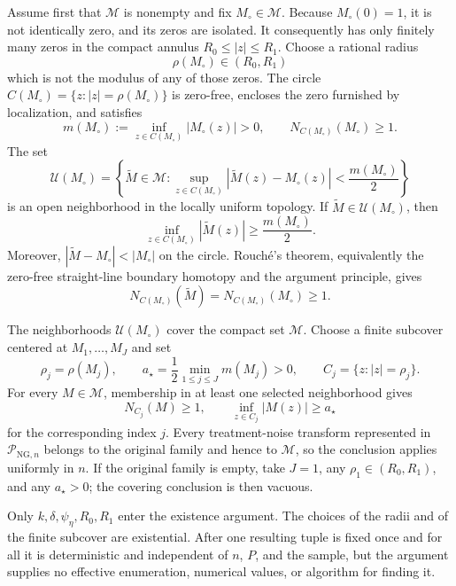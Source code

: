 Assume first that \(\mathscr M\) is nonempty and fix \(M_{\circ}\in\mathscr M\).  Because \(M_{\circ}(0)=1\), it is not identically zero, and its zeros are isolated.  It consequently has only finitely many zeros in the compact annulus \(R_0\le|z|\le R_1\).  Choose a rational radius
\[
 \rho(M_{\circ})\in(R_0,R_1)
\]
which is not the modulus of any of those zeros.  The circle \(C(M_{\circ})=\{z:|z|=\rho(M_{\circ})\}\) is zero-free, encloses the zero furnished by localization, and satisfies
\[
 m(M_{\circ})
 :=\inf_{z\in C(M_{\circ})}|M_{\circ}(z)|>0,
 \qquad
 N_{C(M_{\circ})}(M_{\circ})\ge1.
\]
The set
\[
 \mathcal U(M_{\circ})
 =\left\{\widetilde M\in\mathscr M:
 \sup_{z\in C(M_{\circ})}
 |\widetilde M(z)-M_{\circ}(z)|<\frac{m(M_{\circ})}{2}
 \right\}
\]
is an open neighborhood in the locally uniform topology.  If \(\widetilde M\in\mathcal U(M_{\circ})\), then
\[
 \inf_{z\in C(M_{\circ})}|\widetilde M(z)|
 \ge\frac{m(M_{\circ})}{2}.
\]
Moreover, \(|\widetilde M-M_{\circ}|<|M_{\circ}|\) on the circle.  Rouch\'e's theorem, equivalently the zero-free straight-line boundary homotopy and the argument principle, gives
\[
 N_{C(M_{\circ})}(\widetilde M)
 =N_{C(M_{\circ})}(M_{\circ})
 \ge1.
\]

The neighborhoods \(\mathcal U(M_{\circ})\) cover the compact set \(\mathscr M\).  Choose a finite subcover centered at \(M_1,\ldots,M_J\) and set
\[
 \rho_j=\rho(M_j),
 \qquad
 a_{\star}=\frac12\min_{1\le j\le J}m(M_j)>0,
 \qquad
 C_j=\{z:|z|=\rho_j\}.
\]
For every \(M\in\mathscr M\), membership in at least one selected neighborhood gives
\[
 N_{C_j}(M)\ge1,
 \qquad
 \inf_{z\in C_j}|M(z)|\ge a_{\star}
\]
for the corresponding index \(j\).  Every treatment-noise transform represented in \(\mathcal P_{\mathrm{NG},n}\) belongs to the original family and hence to \(\mathscr M\), so the conclusion applies uniformly in \(n\).  If the original family is empty, take \(J=1\), any \(\rho_1\in(R_0,R_1)\), and any \(a_{\star}>0\); the covering conclusion is then vacuous.

Only \(k,\delta,\psi_{\eta},R_0,R_1\) enter the existence argument.  The choices of the radii and of the finite subcover are existential.  After one resulting tuple is fixed once and for all it is deterministic and independent of \(n\), \(P\), and the sample, but the argument supplies no effective enumeration, numerical values, or algorithm for finding it.